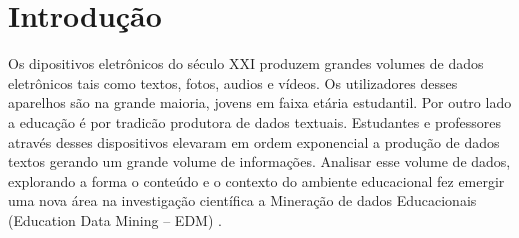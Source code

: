 \documentclass[
	12pt,				%
	openright,			%
	oneside,
	a4paper,			%
	english,			%
	french,				%
	spanish,			%
	brazil,				%
	]{abntex2}
\begin{document}

\tableofcontents*
\cleardoublepage


\textual

\chapter*[Introdução]{Introdução}

Os dipositivos eletrônicos do século XXI produzem grandes volumes de dados eletrônicos tais como textos, fotos, audios e vídeos. Os utilizadores desses aparelhos são na grande maioria, jovens em faixa etária estudantil.
Por outro lado a educação é por tradicão produtora de dados textuais. Estudantes e professores através desses dispositivos elevaram em ordem exponencial a produção de dados textos gerando um grande volume de informações.
Analisar esse volume de dados, explorando a forma o conteúdo e o contexto do ambiente educacional fez emergir uma nova área na investigação científica a Mineração de dados Educacionais (Education Data Mining – EDM) \cite{KoedingerKennethR.2015Dmae}.
  

\end{document}
